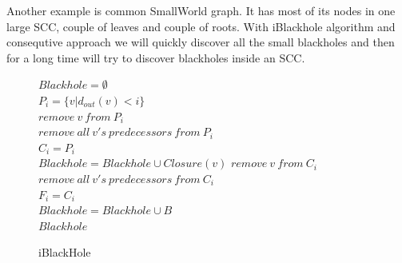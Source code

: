 \documentclass{svproc}
\begin{document}
Another example is common SmallWorld \cite{watts1999networks} graph. It has most of its nodes in one large SCC, couple of leaves and couple of roots.
With iBlackhole algorithm and consequtive approach we will quickly discover all the small blackholes and then for a long time will try to discover
blackholes inside an SCC.

\begin{figure}[H]
	\begin{center}
		\begin{algorithm}[H]
			\SetAlgoLined

                        $Blackhole = \emptyset$ \\
                         {
                            $P_i = \{v | d_{out}(v) < i\}$ \\
                             {
                                 {
                                     {
                                        $remove\ v\ from\ P_i$\\
                                        $remove\ all\ v's\ predecessors\ from\ P_i$\\
                                    }
                                }
                            }
                        }
                        $C_i = P_i$\\
                         {
                             {
                                $Blackhole = Blackhole \cup Closure(v)$
                            }
                             {
                                $remove\ v\ from\ C_i$ \\
                                $remove\ all\ v's\ predecessors\ from\ C_i$ \\
                            }
                        }
                        $F_i = C_i$\\
                         {
                             {
                                 {
                                    $Blackhole = Blackhole \cup B$ \\
                                }
                            }
                        }
                        \Return $Blackhole$
			\label{alg:iblackhole}
			\caption{iBlackHole}
		\end{algorithm}
	\end{center}
\end{figure}
\end{document}
